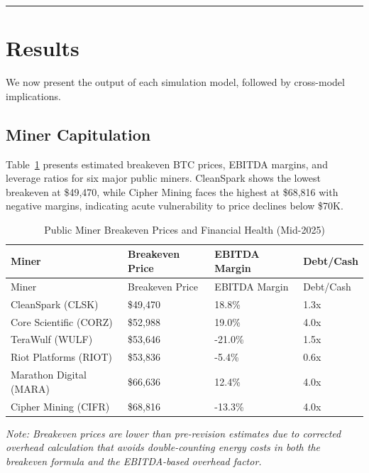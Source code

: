 \documentclass[
  11pt,
]{article}
\let\oldsection\section
\renewcommand{\section}[1]{\FloatBarrier\oldsection{#1}}
\let\oldsubsection\subsection
\renewcommand{\subsection}[1]{\FloatBarrier\oldsubsection{#1}}
\begin{document}
\begin{center}\rule{0.5\linewidth}{0.5pt}\end{center}

\hypertarget{results}{%
\section{Results}\label{results}}

We now present the output of each simulation model, followed by
cross-model implications.

\hypertarget{miner-capitulation}{%
\subsection{Miner Capitulation}\label{miner-capitulation}}

Table~\ref{tbl-breakeven} presents estimated breakeven BTC prices,
EBITDA margins, and leverage ratios for six major public miners.
CleanSpark shows the lowest breakeven at \$49,470, while Cipher Mining
faces the highest at \$68,816 with negative margins, indicating acute
vulnerability to price declines below \$70K.

\hypertarget{tbl-breakeven}{}
\begin{longtable}[]{@{}llll@{}}
\caption{\label{tbl-breakeven}Public Miner Breakeven Prices and
Financial Health (Mid-2025)}\tabularnewline
\toprule\noalign{}
Miner & Breakeven Price & EBITDA Margin & Debt/Cash \\
\midrule\noalign{}
\endfirsthead
\toprule\noalign{}
Miner & Breakeven Price & EBITDA Margin & Debt/Cash \\
\midrule\noalign{}
\endhead
\bottomrule\noalign{}
\endlastfoot
CleanSpark (CLSK) & \$49,470 & 18.8\% & 1.3x \\
Core Scientific (CORZ) & \$52,988 & 19.0\% & 4.0x \\
TeraWulf (WULF) & \$53,646 & -21.0\% & 1.5x \\
Riot Platforms (RIOT) & \$53,836 & -5.4\% & 0.6x \\
Marathon Digital (MARA) & \$66,636 & 12.4\% & 4.0x \\
Cipher Mining (CIFR) & \$68,816 & -13.3\% & 4.0x \\
\end{longtable}

\emph{Note: Breakeven prices are lower than pre-revision estimates due
to corrected overhead calculation that avoids double-counting energy
costs in both the breakeven formula and the EBITDA-based overhead
factor.}
\end{document}
